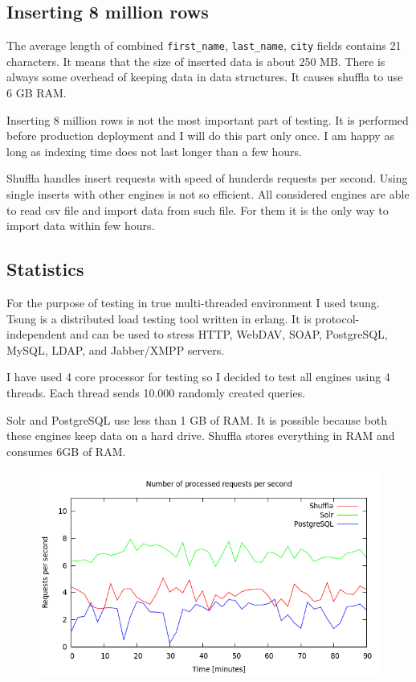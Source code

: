 \documentclass[10pt,a4paper]{article}
\begin{document}
\subsection{Inserting 8 million rows}

The average length of combined \verb|first_name|, \verb|last_name|, \verb|city| fields contains 21 characters. It means that the size of inserted data is about 250 MB. There is always some overhead of keeping data in data structures. It causes shuffla to use 6 GB RAM.

Inserting 8 million rows is not the most important part of testing. It is performed before production deployment and I will do this part only once. I am happy as long as indexing time does not last longer than a few hours. 

Shuffla handles insert requests with speed of hunderds requests per second. Using single inserts with other engines is not so efficient. All considered engines are able to read csv file and import data from such file. For them it is the only way to import data within few hours.

\subsection{Statistics}

For the purpose of testing in true multi-threaded environment I used tsung. Tsung is a distributed load testing tool written in erlang. It is protocol-independent and can be used to stress HTTP, WebDAV, SOAP, PostgreSQL, MySQL, LDAP, and Jabber/XMPP servers. 

I have used 4 core processor for testing so I decided to test all engines using 4 threads. Each thread sends 10.000 randomly created queries. 

Solr and PostgreSQL use less than 1 GB of RAM. It is possible because both these engines keep data on a hard drive. Shuffla stores everything in RAM and consumes 6GB of RAM. 

\begin{figure}[h!]
\centering
  \includegraphics[width=12cm]{request_count_tn}
  \label{fig:request_count_tn}
\end{figure}
\end{document}
